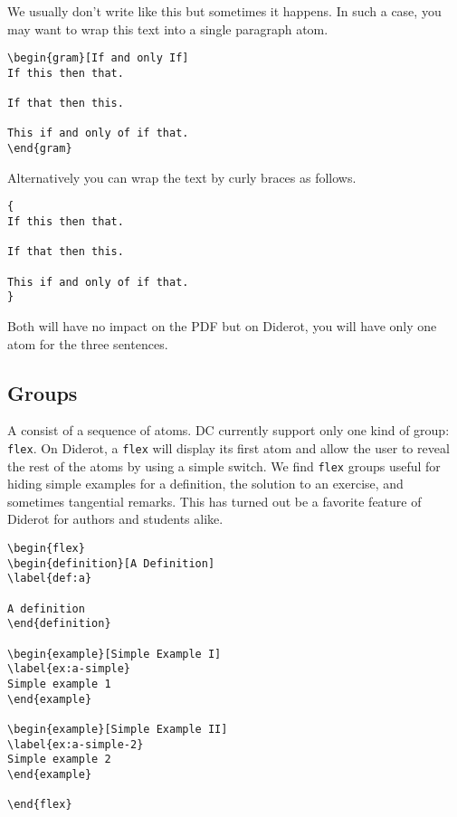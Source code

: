 We usually don't write like this but sometimes it happens.
%
In such a case, you may want to wrap this text into a single paragraph atom.
%
\begin{lstlisting}
\begin{gram}[If and only If]
If this then that.

If that then this.

This if and only of if that.
\end{gram}
\end{lstlisting}
%
Alternatively you can wrap the text by curly braces as follows.
%
\begin{lstlisting}
{
If this then that.

If that then this.

This if and only of if that.
}
\end{lstlisting}
%
%
Both will have no impact on the PDF but on Diderot, you will have only one atom for the three sentences.

\subsection{Groups}
\label{sec:mtl::groups}

\begin{definition}[Group]
A  consist of a sequence of atoms.  DC currently support only one kind of group: \lstinline`flex`.  On Diderot, a \lstinline`flex` will display its first atom and allow the user to reveal the rest of the atoms by using a simple switch.  We find \lstinline`flex` groups useful for hiding simple examples for a definition, the solution to an exercise, and sometimes tangential remarks.  This has turned out be a favorite feature of Diderot for authors and students alike. 

\begin{lstlisting}
\begin{flex}
\begin{definition}[A Definition]
\label{def:a}

A definition
\end{definition}

\begin{example}[Simple Example I]
\label{ex:a-simple}
Simple example 1
\end{example}

\begin{example}[Simple Example II]
\label{ex:a-simple-2}
Simple example 2
\end{example}

\end{flex}
\end{lstlisting}
\end{definition}

